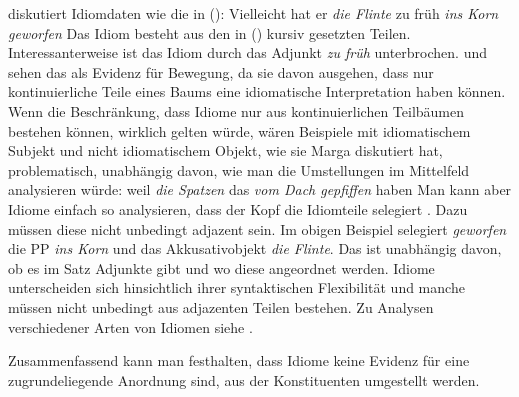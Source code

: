 \begin{exe}
\begin{xlist}
\citet{Fanselow2012a} diskutiert Idiomdaten wie die in ():
\ea
Vielleicht hat er \emph{die Flinte} zu früh \emph{ins Korn geworfen}
\z
Das Idiom besteht aus den in () kursiv gesetzten Teilen. Interessanterweise ist das Idiom
durch das Adjunkt \emph{zu früh} unterbrochen. \citet[]{Fanselow2012a} und
\citet{Salzmann2025a} sehen das als Evidenz für Bewegung, da sie davon ausgehen, dass nur
kontinuierliche Teile eines Baums eine idiomatische Interpretation haben können. Wenn die
Beschränkung, dass Idiome nur aus kontinuierlichen Teilbäumen bestehen können, wirklich gelten
würde, wären Beispiele mit idiomatischem Subjekt und nicht idiomatischem Objekt, wie sie Marga
\citet[]{Reis82} diskutiert hat, problematisch, unabhängig davon, wie man die Umstellungen im
Mittelfeld analysieren würde:
\ea
weil \emph{die Spatzen} das \emph{vom Dach gepfiffen} haben
\z
Man kann aber Idiome einfach so analysieren, dass der Kopf die Idiomteile selegiert \citep{Sag2007a}. Dazu müssen
diese nicht unbedingt adjazent sein. Im obigen Beispiel selegiert \emph{geworfen} die PP \emph{ins
  Korn} und das Akkusativobjekt \emph{die Flinte}. Das ist unabhängig davon, ob es im Satz Adjunkte
gibt und wo diese angeordnet werden. Idiome unterscheiden sich hinsichtlich ihrer
syntaktischen Flexibilität und manche müssen nicht unbedingt aus adjazenten Teilen bestehen. Zu
Analysen verschiedener Arten von Idiomen siehe
.

Zusammenfassend kann man festhalten, dass Idiome keine Evidenz für eine zugrundeliegende Anordnung
sind, aus der Konstituenten umgestellt werden.





\end{xlist}
\end{exe}
